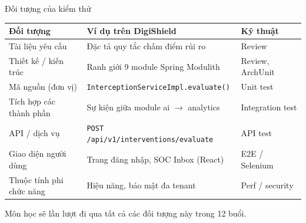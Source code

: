 \documentclass[aspectratio=169,12pt]{beamer}
\begin{document}
\begin{frame}{Đối tượng của kiểm thử}
  \vspace*{-0.3em}
  \begin{center}
  \small
  \setlength{\tabcolsep}{3pt}%
  \begin{tabular}{>{\raggedright\arraybackslash}p{3.0cm}>{\raggedright\arraybackslash}p{8.2cm}>{\raggedright\arraybackslash}p{2.15cm}}
    \toprule
    \textbf{Đối tượng} & \textbf{Ví dụ trên DigiShield} & \textbf{Kỹ thuật} \\
    \midrule
    Tài liệu yêu cầu & Đặc tả quy tắc chấm điểm rủi ro & Review \\
    Thiết kế / kiến trúc & Ranh giới 9 module Spring Modulith & Review, ArchUnit \\
    Mã nguồn (đơn vị) & \texttt{InterceptionServiceImpl\allowbreak.evaluate()} & Unit test \\
    Tích hợp các thành phần & Sự kiện giữa module ai $\to$ analytics & Integration test \\
    API / dịch vụ & \texttt{POST /api/v1/\allowbreak interventions/\allowbreak evaluate} & API test \\
    Giao diện người dùng & Trang đăng nhập, SOC Inbox (React) & E2E / Selenium \\
    Thuộc tính phi chức năng & Hiệu năng, bảo mật đa tenant & Perf / security \\
    \bottomrule
  \end{tabular}
  \end{center}

  \vspace{-0.2em}
  {\small Môn học sẽ lần lượt đi qua tất cả các đối tượng này trong 12 buổi.}
\end{frame}
\end{document}
